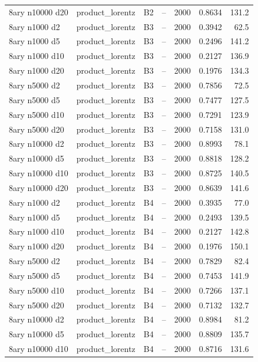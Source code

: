 \begin{longtable}{llllrrr}
8ary n10000 d20 & product\_lorentz & B2 & -- & 2000 & 0.8634 & 131.2 \\
8ary n1000 d2 & product\_lorentz & B3 & -- & 2000 & 0.3942 & 62.5 \\
8ary n1000 d5 & product\_lorentz & B3 & -- & 2000 & 0.2496 & 141.2 \\
8ary n1000 d10 & product\_lorentz & B3 & -- & 2000 & 0.2127 & 136.9 \\
8ary n1000 d20 & product\_lorentz & B3 & -- & 2000 & 0.1976 & 134.3 \\
8ary n5000 d2 & product\_lorentz & B3 & -- & 2000 & 0.7856 & 72.5 \\
8ary n5000 d5 & product\_lorentz & B3 & -- & 2000 & 0.7477 & 127.5 \\
8ary n5000 d10 & product\_lorentz & B3 & -- & 2000 & 0.7291 & 123.9 \\
8ary n5000 d20 & product\_lorentz & B3 & -- & 2000 & 0.7158 & 131.0 \\
8ary n10000 d2 & product\_lorentz & B3 & -- & 2000 & 0.8993 & 78.1 \\
8ary n10000 d5 & product\_lorentz & B3 & -- & 2000 & 0.8818 & 128.2 \\
8ary n10000 d10 & product\_lorentz & B3 & -- & 2000 & 0.8725 & 140.5 \\
8ary n10000 d20 & product\_lorentz & B3 & -- & 2000 & 0.8639 & 141.6 \\
8ary n1000 d2 & product\_lorentz & B4 & -- & 2000 & 0.3935 & 77.0 \\
8ary n1000 d5 & product\_lorentz & B4 & -- & 2000 & 0.2493 & 139.5 \\
8ary n1000 d10 & product\_lorentz & B4 & -- & 2000 & 0.2127 & 142.8 \\
8ary n1000 d20 & product\_lorentz & B4 & -- & 2000 & 0.1976 & 150.1 \\
8ary n5000 d2 & product\_lorentz & B4 & -- & 2000 & 0.7829 & 82.4 \\
8ary n5000 d5 & product\_lorentz & B4 & -- & 2000 & 0.7453 & 141.9 \\
8ary n5000 d10 & product\_lorentz & B4 & -- & 2000 & 0.7266 & 137.1 \\
8ary n5000 d20 & product\_lorentz & B4 & -- & 2000 & 0.7132 & 132.7 \\
8ary n10000 d2 & product\_lorentz & B4 & -- & 2000 & 0.8984 & 81.2 \\
8ary n10000 d5 & product\_lorentz & B4 & -- & 2000 & 0.8809 & 135.7 \\
8ary n10000 d10 & product\_lorentz & B4 & -- & 2000 & 0.8716 & 131.6 \\

\end{longtable}
